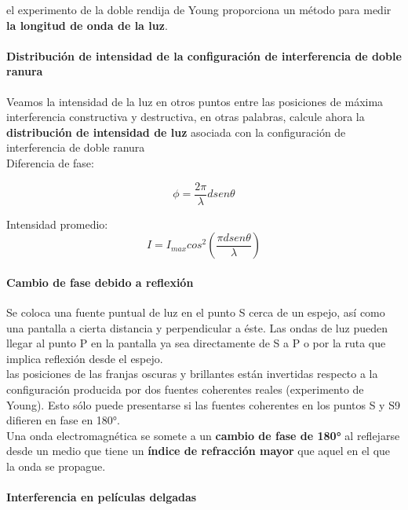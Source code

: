 \documentclass[10pt]{article}
\begin{document}
el experimento de la doble rendija de Young
proporciona un método para medir \textbf{la longitud de onda de la luz}.

\paragraph{Distribución de intensidad de la configuración
de interferencia de doble ranura}

Veamos la intensidad de la luz
en otros puntos entre las posiciones de máxima interferencia constructiva y destructiva, en otras palabras,  calcule ahora la \textbf{distribución de intensidad de luz} asociada con la configuración
de interferencia de doble ranura\\
\linebreak
Diferencia de fase:

\begin{equation*}
	\phi = \dfrac{2\pi}{\lambda}dsen\theta
\end{equation*}

Intensidad promedio:
\begin{equation*}
	I = I_{max} cos^2 \left( \dfrac{\pi d sen\theta}{\lambda} \right)
\end{equation*}

\paragraph{Cambio de fase debido a reflexión}
Se coloca una fuente puntual de luz en el punto S cerca de un espejo, así
como una pantalla a cierta distancia y perpendicular a éste. Las ondas de luz pueden llegar
al punto P en la pantalla ya sea directamente de S a P o por la ruta que implica reflexión
desde el espejo.\\

las posiciones de las franjas oscuras y brillantes están invertidas respecto a la configuración
producida por dos fuentes coherentes reales (experimento de Young). Esto sólo puede presentarse si las fuentes coherentes en los puntos S y S9 difieren en fase en 180°.\\
\linebreak
Una onda electromagnética se somete a un \textbf{cambio de fase de 180°} al reflejarse desde un medio que tiene un \textbf{índice de refracción mayor} que aquel en el que la onda se propague.

\paragraph{Interferencia en películas delgadas}
\end{document}

